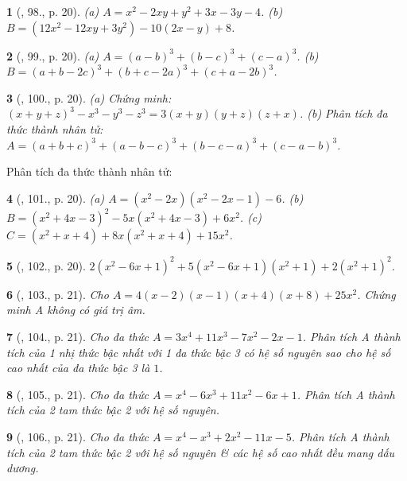 \documentclass{article}
\newtheorem{baitoan}{}
\begin{document}
\begin{baitoan}[\cite{Tuyen_Toan_8}, 98., p. 20]
	(a) $A = x^2 - 2xy + y^2 + 3x - 3y - 4$. (b) $B = (12x^2 - 12xy + 3y^2) - 10(2x - y) + 8$.
\end{baitoan}

\begin{baitoan}[\cite{Tuyen_Toan_8}, 99., p. 20]
	(a) $A = (a - b)^3 + (b - c)^3 + (c - a)^3$. (b) $B = (a + b - 2c)^3 + (b + c - 2a)^3 + (c + a - 2b)^3$.
\end{baitoan}

\begin{baitoan}[\cite{Tuyen_Toan_8}, 100., p. 20]
	(a) Chứng minh: $(x + y + z)^3 - x^3 - y^3 - z^3 = 3(x + y)(y + z)(z + x)$. (b) Phân tích đa thức thành nhân tử: $A = (a + b + c)^3 + (a - b - c)^3 + (b - c - a)^3 + (c - a - b)^3$.
\end{baitoan}
Phân tích đa thức thành nhân tử:

\begin{baitoan}[\cite{Tuyen_Toan_8}, 101., p. 20]
	(a) $A = (x^2 - 2x)(x^2 - 2x - 1) - 6$. (b) $B = (x^2 + 4x - 3)^2 - 5x(x^2 + 4x - 3) + 6x^2$. (c) $C = (x^2 + x + 4) + 8x(x^2 + x + 4) + 15x^2$.
\end{baitoan}

\begin{baitoan}[\cite{Tuyen_Toan_8}, 102., p. 20]
	$2(x^2 - 6x + 1)^2 + 5(x^2 - 6x + 1)(x^2 + 1) + 2(x^2 + 1)^2$.
\end{baitoan}

\begin{baitoan}[\cite{Tuyen_Toan_8}, 103., p. 21]
	Cho $A = 4(x - 2)(x - 1)(x + 4)(x + 8) + 25x^2$. Chứng minh A không có giá trị âm.
\end{baitoan}

\begin{baitoan}[\cite{Tuyen_Toan_8}, 104., p. 21]
	Cho đa thức $A = 3x^4 + 11x^3 - 7x^2 - 2x - 1$. Phân tích A thành tích của 1 nhị thức bậc nhất với 1 đa thức bậc 3 có hệ số nguyên sao cho hệ số cao nhất của đa thức bậc 3 là $1$. 
\end{baitoan}

\begin{baitoan}[\cite{Tuyen_Toan_8}, 105., p. 21]
	Cho đa thức $A = x^4 - 6x^3 + 11x^2 - 6x + 1$. Phân tích A thành tích của 2 tam thức bậc 2 với hệ số nguyên.
\end{baitoan}

\begin{baitoan}[\cite{Tuyen_Toan_8}, 106., p. 21]
	Cho đa thức $A = x^4 - x^3 + 2x^2 - 11x - 5$. Phân tích A thành tích của 2 tam thức bậc 2 với hệ số nguyên \& các hệ số cao nhất đều mang dấu dương.
\end{baitoan}
\end{document}
